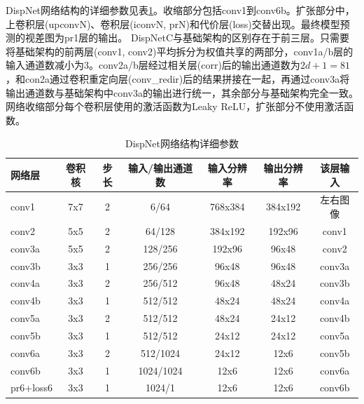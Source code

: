 DispNet网络结构的详细参数见表\ref{tab:4_1_DispNet_architecture}。收缩部分包括conv1到conv6b。扩张部分中，上卷积层(upconvN)、卷积层(iconvN,  prN)和代价层(loss)交替出现。最终模型预测的视差图为pr1层的输出。
DispNetC与基础架构的区别存在于前三层。只需要将基础架构的前两层(conv1, conv2)平均拆分为权值共享的两部分，conv1a/b层的输入通道数减小为3。conv2a/b层经过相关层(corr)后的输出通道数为$2d+1=81$，和con2a通过卷积重定向层(conv\_redir)后的结果拼接在一起，再通过conv3a将输出通道数与基础架构中conv3a的输出进行统一，其余部分与基础架构完全一致。
网络收缩部分每个卷积层使用的激活函数为Leaky ReLU，扩张部分不使用激活函数。

\begin{table}[htbp] %
	\centering
	\caption{DispNet网络结构详细参数}
	\label{tab:4_1_DispNet_architecture}
	\begin{scriptsize}   %
		\begin{tabular}{|l|c c c|c c|c|}\hline
			网络层 & 卷积核 & 步长 & 输入/输出通道数 & 输入分辨率 & 输出分辨率 & 该层输入 \\\hline
			conv1    & 7x7 & 2 & 6/64                & 768x384 & 384x192 & 左右图像 \\
			conv2    & 5x5 & 2 & 64/128           & 384x192  & 192x96    & conv1 \\
			conv3a & 5x5 & 2 & 128/256         & 192x96     & 96x48      & conv2 \\
			conv3b & 3x3 & 1 & 256/256        & 96x48       & 96x48      & conv3a\\
			conv4a & 3x3 & 2 & 256/512        & 96x48        & 48x24      & conv3b \\
			conv4b & 3x3 & 1 & 512/512         & 48x24        & 48x24       & conv4a \\
			conv5a & 3x3 & 2 & 512/512         & 48x24        & 24x12        & conv4b \\
			conv5b & 3x3 & 1 & 512/512         & 24x12          & 24x12       & conv5a \\
			conv6a & 3x3 & 2 & 512/1024     & 24x12          & 12x6          & conv5b \\
			conv6b & 3x3 & 1 & 1024/1024  & 12x6             & 12x6          & conv6a \\\hline
			pr6+loss6 & 3x3 & 1 & 1024/1 & 12x6 & 12x6 & conv6b \\\hline

\end{tabular}
\end{scriptsize}
\end{table}
